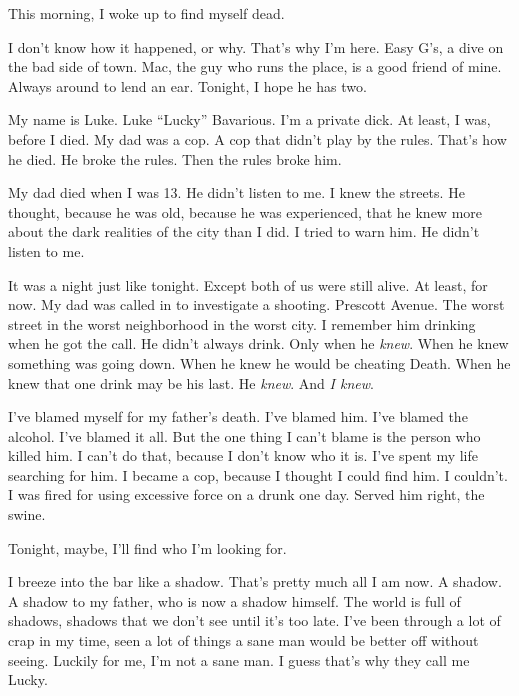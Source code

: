 This morning, I woke up to find myself dead.



I don't know how it happened, or why. That's why I'm here. Easy
G's, a dive on the bad side of town. Mac, the guy who runs the
place, is a good friend of mine. Always around to lend an ear.
Tonight, I hope he has two.



My name is Luke. Luke ``Lucky'' Bavarious. I'm a private dick. At
least, I was, before I died. My dad was a cop. A cop that didn't
play by the rules. That's how he died. He broke the rules. Then the
rules broke him.



My dad died when I was 13. He didn't listen to me. I knew the
streets. He thought, because he was old, because he was
experienced, that he knew more about the dark realities of the city
than I did. I tried to warn him. He didn't listen to me.



It was a night just like tonight. Except both of us were still
alive. At least, for now. My dad was called in to investigate a
shooting. Prescott Avenue. The worst street in the worst
neighborhood in the worst city. I remember him drinking when he got
the call. He didn't always drink. Only when he {\em knew}. When he
knew something was going down. When he knew he would be cheating
Death. When he knew that one drink may be his last. He {\em knew}.
And {\em I knew}.



I've blamed myself for my father's death. I've blamed him. I've
blamed the alcohol. I've blamed it all. But the one thing I can't
blame is the person who killed him. I can't do that, because I
don't know who it is. I've spent my life searching for him. I
became a cop, because I thought I could find him. I couldn't. I was
fired for using excessive force on a drunk one day. Served him
right, the swine.



Tonight, maybe, I'll find who I'm looking for.



I breeze into the bar like a shadow. That's pretty much all I am
now. A shadow. A shadow to my father, who is now a shadow himself.
The world is full of shadows, shadows that we don't see until it's
too late. I've been through a lot of crap in my time, seen a lot of
things a sane man would be better off without seeing. Luckily for
me, I'm not a sane man. I guess that's why they call me
Lucky.



